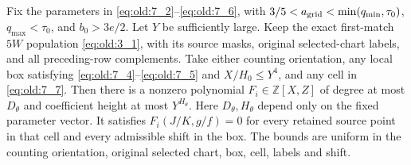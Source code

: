 \begin{lemma}\label{lem:ratio-cell-determinant}
Fix the parameters in \eqref{eq:old:7_2}--\eqref{eq:old:7_6}, with
\(3/5<a_{\rm grid}<\min(q_{\min},\tau_0)\),
\(q_{\max}<\tau_0\), and \(b_0>3e/2\). Let \(Y\) be sufficiently large.
Keep the exact first-match \(5W\) population
\eqref{eq:old:3_1}, with its source masks, original selected-chart labels,
and all preceding-row complements. Take either counting orientation,
any local box satisfying
\eqref{eq:old:7_4}--\eqref{eq:old:7_5} and \(X/H_0\le Y^4\), and any
cell in \eqref{eq:old:7_7}. Then there is a
nonzero polynomial
\(F_i\in\mathbb Z[X,Z]\) of degree at
most \(D_\theta\) and coefficient height at most \(Y^{H_\theta}\). Here
\(D_\theta,H_\theta\) depend only on the fixed parameter vector. It
satisfies \(F_i(J/K,g/f)=0\) for every retained source point in that cell
and every admissible shift in the box. The bounds are uniform in the
counting orientation, original selected chart, box, cell, labels and shift.
\end{lemma}
